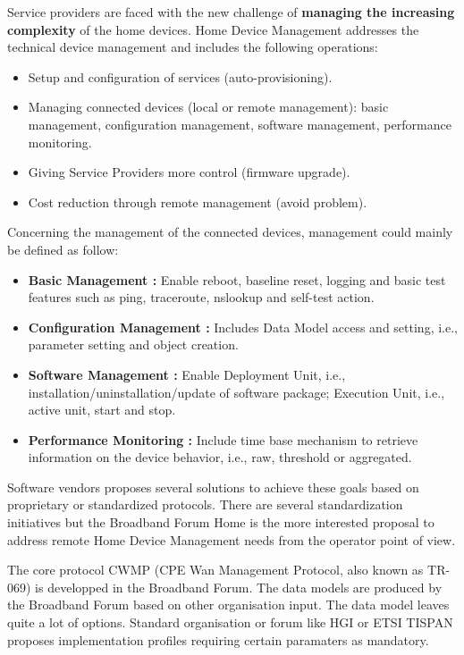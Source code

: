 Service providers are faced with the new challenge of \textbf{managing the increasing complexity} of the home devices. Home Device Management addresses the technical device management and includes the following operations:
\begin{itemize}
  \it
  \item Setup and configuration of services (auto-provisioning).
  \item Managing connected devices (local or remote management): basic management, configuration management, software management, performance monitoring.
  \item Giving Service Providers more control (firmware upgrade).
	\item Cost reduction through remote management (avoid problem).
\end{itemize}
Concerning the management of the connected devices, management could mainly be defined as follow:
\begin{itemize}
  \it
  \item \textbf{Basic Management :} Enable reboot, baseline reset, logging and basic test features such as ping, traceroute, nslookup and self-test action.
  \item \textbf{Configuration Management :} Includes Data Model access and setting, i.e., parameter setting and object creation.
  \item \textbf{Software Management :} Enable Deployment Unit, i.e., installation/uninstallation/update of software package; Execution Unit, i.e., active unit, start and stop.
	\item \textbf{Performance Monitoring :} Include time base mechanism to retrieve information on the device behavior, i.e., raw, threshold or aggregated.
\end{itemize}
Software vendors proposes several solutions to achieve these goals based on proprietary or standardized protocols. There are several standardization initiatives but the Broadband Forum Home is the more interested proposal to address remote Home Device Management needs from the operator point of view.

The core protocol CWMP (CPE Wan Management Protocol, also known as TR-069) is developped in the Broadband Forum. The data models are produced by the Broadband Forum based on other organisation input. The data model leaves quite a lot of options. Standard organisation or forum like HGI or ETSI TISPAN proposes implementation profiles requiring certain paramaters as mandatory.

